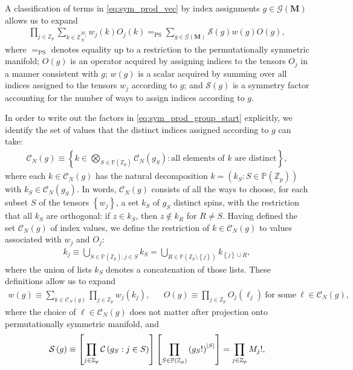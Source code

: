 \documentclass[nofootinbib,notitlepage,11pt]{revtex4-2}
\renewcommand{\t}{\text} %
\newcommand{\p}[1]{\left(#1\right)} %
\renewcommand{\sp}[1]{\left[#1\right]} %
\renewcommand{\set}[1]{\left\{#1\right\}} %
\newcommand{\m}{\bm} %
\newcommand{\1}{\mathds{1}}
\newcommand{\C}{\mathcal{C}}
\newcommand{\G}{\mathcal{G}}
\renewcommand{\S}{\mathcal{S}}
\newcommand{\PP}{\mathbb{P}}
\newcommand{\ZZ}{\mathbb{Z}}
\newcommand{\EQPS}{=_{\text{PS}}}
\begin{document}
A classification of terms in \eqref{eq:sym_prod_vec} by index
assignments $g\in\G\p{\m M}$ allows us to expand
\begin{align}
  \prod_{j\in\ZZ_p} \sum_{k\in\ZZ_N^{M_j}} w_j\p{k} O_j\p{k}
  \EQPS \sum_{g\in\G\p{\m M}} \S\p{g} w\p{g} O\p{g},
  \label{eq:sym_prod_group_start}
\end{align}
where $\EQPS$ denotes equality up to a restriction to the
permutationally symmetric manifold; $O\p{g}$ is an operator acquired
by assigning indices to the tensors $O_j$ in a manner consistent with
$g$; $w\p{g}$ is a scalar acquired by summing over all indices
assigned to the tensors $w_j$ according to $g$; and $\S\p{g}$ is a
symmetry factor accounting for the number of ways to assign indices
according to $g$.

In order to write out the factors in \eqref{eq:sym_prod_group_start}
explicitly, we identify the set of values that the distinct indices
assigned according to $g$ can take:
\begin{align}
  \C_N\p{g}
  \equiv \set{ k \in \bigotimes_{S\in\PP\p{\ZZ_p}} \C_N\p{g_S}
    : \t{all elements of $k$ are distinct} },
  \label{eq:index_values}
\end{align}
where each $k\in\C_N\p{g}$ has the natural decomposition
$k=\p{k_S:S\in\PP\p{\ZZ_p}}$ with $k_S\in\C_N\p{g_S}$.  In words,
$\C_N\p{g}$ consists of all the ways to choose, for each subset $S$ of
the tensors $\set{w_j}$, a set $k_S$ of $g_S$ distinct spins, with the
restriction that all $k_S$ are orthogonal: if $z\in k_S$, then
$z\notin k_R$ for $R\ne S$.  Having defined the set $\C_N\p{g}$ of
index values, we define the restriction of $k\in\C_N\p{g}$ to values
associated with $w_j$ and $O_j$:
\begin{align}
  k_j \equiv \bigcup_{S\in\PP\p{\ZZ_p} : j\in S} k_S
  = \bigcup_{R\in\PP\p{\ZZ_p\setminus\set{j}}} k_{\set{j}\cup R},
\end{align}
where the union of lists $k_S$ denotes a concatenation of those lists.
These definitions allow us to expand
\begin{align}
  w\p{g} \equiv \sum_{k\in\C_N\p{g}} \prod_{j\in\ZZ_p} w_j\p{k_j},
  &&
  O\p{g} \equiv \prod_{j\in\ZZ_p}
  O_j\p{\ell_j}~\t{for some}~\ell\in\C_N\p{g},
  \label{eq:diagram_factors}
\end{align}
where the choice of $\ell\in\C_N\p{g}$ does not matter after
projection onto permutationally symmetric manifold, and
\begin{align}
  \S\p{g} \equiv \sp{\prod_{j\in\ZZ_p} \C\p{ g_S : j\in S }}
  \sp{\prod_{S\in\PP\p{\ZZ_p}} \p{g_S!}^\abs{S}}
  = \prod_{j\in\ZZ_p} M_j!,
  \label{eq:sym_prod_symmetry}
\end{align}
\end{document}

